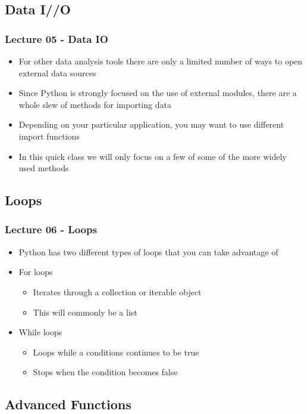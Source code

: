 \documentclass[mini frame in current subsection]{beamer}
\begin{document}
	\subsection{Data I//O}
	
		\begin{frame}
			\frametitle{Lecture 05 - Data IO}
			\begin{itemize}
				\vfill\item  For other data analysis tools there are only a limited number of ways to open external data sources
				\vfill\item  Since Python is strongly focused on the use of external modules, there are a whole slew of methods for importing data
				\vfill\item  Depending on your particular application, you may want to use different import functions
				\vfill\item  In this quick class we will only focus on a few of some of the more widely used methods
			\end{itemize}
		\end{frame}
		
	\subsection{Loops}
	
		\begin{frame}
			\frametitle{Lecture 06 - Loops}
			\begin{itemize}
				\vfill\item  Python has two different types of loops that you can take advantage of
				\vfill\item  For loops
					\begin{itemize}
						\item  Iterates through a collection or iterable object
						\item  This will commonly be a list
					\end{itemize}
				\vfill\item  While loops
					\begin{itemize}
						\item  Loops while a conditions continues to be true
						\item  Stops when the condition becomes false
					\end{itemize}
			\end{itemize}
		\end{frame}
		
	\subsection{Advanced Functions}
	
\end{document}
